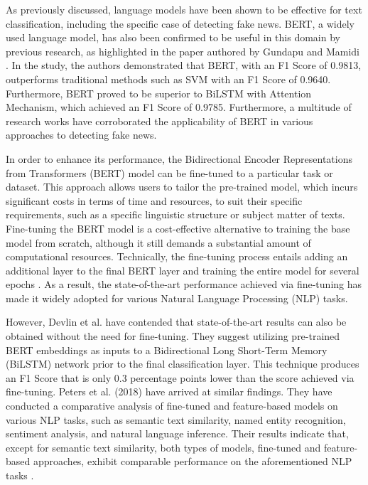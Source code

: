 As previously discussed, language models have been shown to be effective for text classification, including the specific case of detecting fake news. BERT, a widely used language model, has also been confirmed to be useful in this domain by previous research, as highlighted in the paper authored by Gundapu and Mamidi \autocite{Gundapu2021}. In the study, the authors demonstrated that BERT, with an F1 Score of 0.9813, outperforms traditional methods such as SVM with an F1 Score of 0.9640. Furthermore, BERT proved to be superior to BiLSTM with Attention Mechanism, which achieved an F1 Score of 0.9785.
Furthermore, a multitude of research works \autocite{Alonso-Bartolome2021, Wang2021, Singhal2019, Aljawarneh2022, Jwa2019, Yang2019} have corroborated the applicability of BERT in various approaches to detecting fake news.

In order to enhance its performance, the Bidirectional Encoder Representations from Transformers (BERT) model can be fine-tuned to a particular task or dataset. This approach allows users to tailor the pre-trained model, which incurs significant costs in terms of time and resources, to suit their specific requirements, such as a specific linguistic structure or subject matter of texts. Fine-tuning the BERT model is a cost-effective alternative to training the base model from scratch, although it still demands a substantial amount of computational resources. Technically, the fine-tuning process entails adding an additional layer to the final BERT layer and training the entire model for several epochs \autocite{Devlin2018}. As a result, the state-of-the-art performance achieved via fine-tuning has made it widely adopted for various Natural Language Processing (NLP) tasks.

However, Devlin et al. have contended that state-of-the-art results can also be obtained without the need for fine-tuning. They suggest utilizing pre-trained BERT embeddings as inputs to a Bidirectional Long Short-Term Memory (BiLSTM) network prior to the final classification layer. This technique produces an F1 Score that is only 0.3 percentage points lower than the score achieved via fine-tuning. Peters et al. (2018) have arrived at similar findings. They have conducted a comparative analysis of fine-tuned and feature-based models on various NLP tasks, such as semantic text similarity, named entity recognition, sentiment analysis, and natural language inference. Their results indicate that, except for semantic text similarity, both types of models, fine-tuned and feature-based approaches, exhibit comparable performance on the aforementioned NLP tasks \autocite{Peters2019}.

